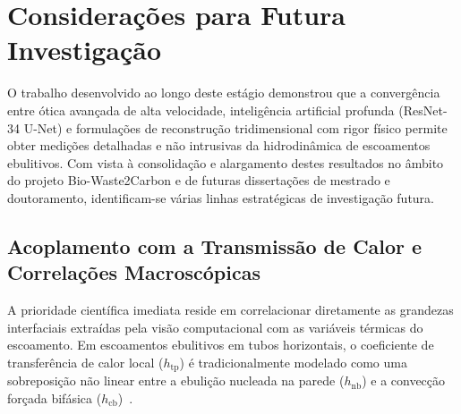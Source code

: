 \section{Considerações para Futura Investigação}
\label{sec:investigacao_futura}

O trabalho desenvolvido ao longo deste estágio demonstrou que a convergência entre ótica avançada de alta velocidade, inteligência artificial profunda (ResNet-34 U-Net) e formulações de reconstrução tridimensional com rigor físico permite obter medições detalhadas e não intrusivas da hidrodinâmica de escoamentos ebulitivos. Com vista à consolidação e alargamento destes resultados no âmbito do projeto Bio-Waste2Carbon e de futuras dissertações de mestrado e doutoramento, identificam-se várias linhas estratégicas de investigação futura.

\subsection{Acoplamento com a Transmissão de Calor e Correlações Macroscópicas}
\label{subsec:acoplamento_termico}

A prioridade científica imediata reside em correlacionar diretamente as grandezas interfaciais extraídas pela visão computacional com as variáveis térmicas do escoamento. Em escoamentos ebulitivos em tubos horizontais, o coeficiente de transferência de calor local ($h_{\text{tp}}$) é tradicionalmente modelado como uma sobreposição não linear entre a ebulição nucleada na parede ($h_{\text{nb}}$) e a convecção forçada bifásica ($h_{\text{cb}}$)~\cite{collier1994convective, kandlikar1990general}.

